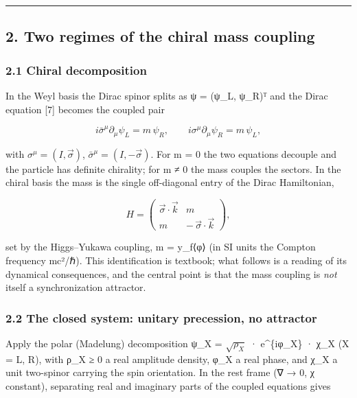 \documentclass[
]{article}
\begin{document}
\begin{center}\rule{0.5\linewidth}{0.5pt}\end{center}

\subsection{2. Two regimes of the chiral mass
coupling}\label{two-regimes-of-the-chiral-mass-coupling-1}

\subsubsection{2.1 Chiral decomposition}\label{chiral-decomposition}

In the Weyl basis the Dirac spinor splits as ψ = (ψ\_L, ψ\_R)ᵀ and the
Dirac equation {[}7{]} becomes the coupled pair

\[i\bar{\sigma}^\mu \partial_\mu \psi_L = m\,\psi_R, \qquad i\sigma^\mu \partial_\mu \psi_R = m\,\psi_L,\]

with \(\sigma^\mu = (I, \vec{\sigma})\),
\(\bar{\sigma}^\mu = (I, -\vec{\sigma})\). For m = 0 the two equations
decouple and the particle has definite chirality; for m ≠ 0 the mass
couples the sectors. In the chiral basis the mass is the single
off-diagonal entry of the Dirac Hamiltonian,

\[H = \begin{pmatrix} \vec{\sigma}\cdot\vec{k} & m \\ m & -\,\vec{\sigma}\cdot\vec{k} \end{pmatrix},\]

set by the Higgs--Yukawa coupling, m = y\_f⟨φ⟩ (in SI units the Compton
frequency mc²/ℏ). This identification is textbook; what follows is a
reading of its dynamical consequences, and the central point is that the
mass coupling is \emph{not} itself a synchronization attractor.

\subsubsection{2.2 The closed system: unitary precession, no
attractor}\label{the-closed-system-unitary-precession-no-attractor}

Apply the polar (Madelung) decomposition ψ\_X = \(\sqrt{\rho_X}\) ·
e\^{}\{iφ\_X\} · χ\_X (X = L, R), with ρ\_X ≥ 0 a real amplitude
density, φ\_X a real phase, and χ\_X a unit two-spinor carrying the spin
orientation. In the rest frame (∇ → 0, χ constant), separating real and
imaginary parts of the coupled equations gives
\end{document}
